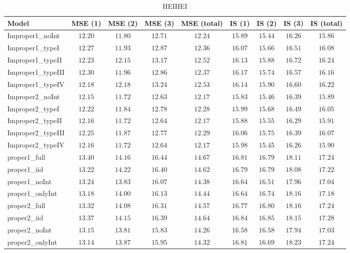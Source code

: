 \begin{table}

\caption{\label{tab:model-choice-sc11}HEIHEI}
\centering
\begin{tabular}{lcccccccc}
\hline
Model  & MSE (1) & MSE (2) & MSE (3) & MSE (total) & IS (1) & IS (2) & IS (3) & \multicolumn{1}{c}{IS (total)} \\ 
\hline
Improper1_noInt  & $12.20$ & $11.80$ & $12.71$ & $12.24$ & $15.89$ & $15.44$ & $16.26$ & $15.86$ \\
Improper1_typeI  & $12.27$ & $11.93$ & $12.87$ & $12.36$ & $16.07$ & $15.66$ & $16.51$ & $16.08$ \\
Improper1_typeII  & $12.23$ & $12.15$ & $13.17$ & $12.52$ & $16.13$ & $15.88$ & $16.72$ & $16.24$ \\
Improper1_typeIII  & $12.30$ & $11.96$ & $12.86$ & $12.37$ & $16.17$ & $15.74$ & $16.57$ & $16.16$ \\
Improper1_typeIV  & $12.18$ & $12.18$ & $13.24$ & $12.53$ & $16.14$ & $15.90$ & $16.60$ & $16.22$ \\
Improper2_noInt  & $12.15$ & $11.72$ & $12.63$ & $12.17$ & $15.83$ & $15.46$ & $16.39$ & $15.89$ \\
Improper2_typeI  & $12.22$ & $11.84$ & $12.78$ & $12.28$ & $15.99$ & $15.68$ & $16.49$ & $16.05$ \\
Improper2_typeII  & $12.16$ & $11.72$ & $12.64$ & $12.17$ & $15.88$ & $15.55$ & $16.29$ & $15.91$ \\
Improper2_typeIII  & $12.25$ & $11.87$ & $12.77$ & $12.29$ & $16.06$ & $15.75$ & $16.39$ & $16.07$ \\
Improper2_typeIV  & $12.16$ & $11.72$ & $12.64$ & $12.17$ & $15.98$ & $15.45$ & $16.26$ & $15.90$ \\
proper1_full  & $13.40$ & $14.16$ & $16.44$ & $14.67$ & $16.81$ & $16.79$ & $18.11$ & $17.24$ \\
proper1_iid  & $13.22$ & $14.22$ & $16.40$ & $14.62$ & $16.79$ & $16.79$ & $18.08$ & $17.22$ \\
proper1_noInt  & $13.24$ & $13.83$ & $16.07$ & $14.38$ & $16.64$ & $16.51$ & $17.96$ & $17.04$ \\
proper1_onlyInt  & $13.18$ & $14.00$ & $16.13$ & $14.44$ & $16.64$ & $16.74$ & $18.16$ & $17.18$ \\
proper2_full  & $13.32$ & $14.08$ & $16.31$ & $14.57$ & $16.77$ & $16.80$ & $18.16$ & $17.24$ \\
proper2_iid  & $13.37$ & $14.15$ & $16.39$ & $14.64$ & $16.84$ & $16.85$ & $18.15$ & $17.28$ \\
proper2_noInt  & $13.15$ & $13.81$ & $15.83$ & $14.26$ & $16.58$ & $16.58$ & $17.94$ & $17.03$ \\
proper2_onlyInt  & $13.14$ & $13.87$ & $15.95$ & $14.32$ & $16.81$ & $16.69$ & $18.23$ & $17.24$ \\
\hline 
\end{tabular}


\end{table}